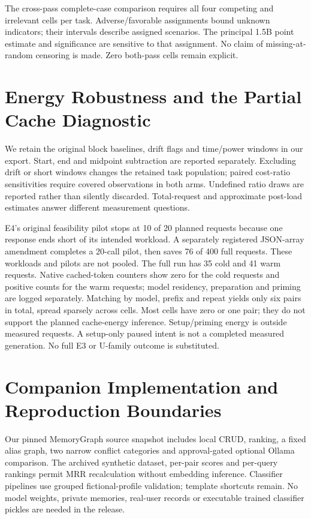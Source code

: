 \documentclass[10pt,a4paper,twocolumn]{article}
\begin{document}
The cross-pass complete-case comparison requires all four competing and
irrelevant cells per task. Adverse/favorable assignments bound unknown
indicators; their intervals describe assigned scenarios. The principal 1.5B
point estimate and significance are sensitive to that assignment. No claim of
missing-at-random censoring is made. Zero both-pass cells remain explicit.

\section{Energy Robustness and the Partial Cache Diagnostic}
We retain the original block baselines, drift flags and time/power windows in our
export. Start, end and midpoint subtraction are reported separately. Excluding
drift or short windows changes the retained task population; paired cost-ratio
sensitivities require covered observations in both arms. Undefined ratio draws
are reported rather than silently discarded. Total-request and approximate
post-load estimates answer different measurement questions.

E4's original feasibility pilot stops at 10 of 20 planned requests because one
response ends short of its intended workload. A separately registered JSON-array
amendment completes a 20-call pilot, then saves 76 of 400 full requests. These
workloads and pilots are not pooled. The full run has 35 cold and 41 warm
requests. Native cached-token counters show zero for the cold requests and
positive counts for the warm requests; model residency, preparation and priming
are logged separately. Matching by model, prefix and repeat yields only six
pairs in total, spread sparsely across cells. Most cells have zero or one pair;
they do not support the planned cache-energy inference. Setup/priming energy
is outside measured requests. A setup-only paused intent is not a completed
measured generation. No full E3 or U-family outcome is substituted.

\section{Companion Implementation and Reproduction Boundaries}
Our pinned MemoryGraph source snapshot includes local CRUD, ranking, a fixed
alias graph, two narrow conflict categories and approval-gated optional Ollama
comparison. The archived synthetic dataset, per-pair scores and per-query
rankings permit MRR recalculation without embedding inference. Classifier
pipelines use grouped fictional-profile validation; template shortcuts remain.
No model weights, private memories, real-user records or executable trained
classifier pickles are needed in the release.
\end{document}
